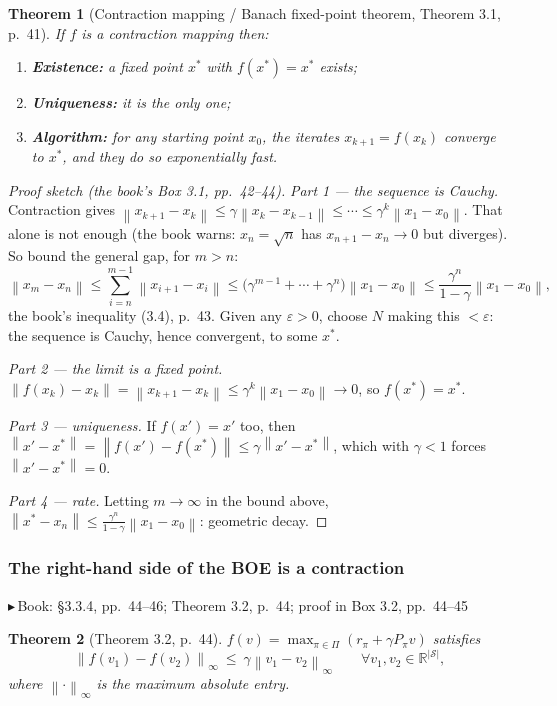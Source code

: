 \documentclass[11pt, letterpaper]{article}
\theoremstyle{runin}
\theoremstyle{runinplain}
\newtheorem{theorem}{Theorem}[section]
\theoremstyle{remark}
\newcommand{\R}{\mathbb{R}}
\newcommand{\norm}[1]{\left\lVert #1 \right\rVert}
\newcommand{\Sspace}{\mathcal{S}}
\newcommand{\bk}[1]{{\color{bookblue}\small$\blacktriangleright$\,\textsf{Book: #1}}}
\begin{document}
\begin{theorem}[Contraction mapping / Banach fixed-point theorem, Theorem 3.1, p.~41]
If $f$ is a contraction mapping then:
\begin{enumerate}
  \item \textbf{Existence:} a fixed point $x^*$ with $f(x^*)=x^*$ exists;
  \item \textbf{Uniqueness:} it is the only one;
  \item \textbf{Algorithm:} for any starting point $x_0$, the iterates
        $x_{k+1}=f(x_k)$ converge to $x^*$, and they do so exponentially fast.
\end{enumerate}
\end{theorem}

\begin{proof}[Proof sketch (the book's Box 3.1, pp.~42--44)]
\emph{Part 1 --- the sequence is Cauchy.} Contraction gives
$\norm{x_{k+1}-x_k}\le\gamma\norm{x_k-x_{k-1}}\le\cdots\le\gamma^k\norm{x_1-x_0}$.
That alone is not enough (the book warns: $x_n=\sqrt n$ has
$x_{n+1}-x_n\to0$ but diverges). So bound the general gap, for $m>n$:
\[
  \norm{x_m-x_n}\le\sum_{i=n}^{m-1}\norm{x_{i+1}-x_i}
  \le\bigl(\gamma^{m-1}+\cdots+\gamma^{n}\bigr)\norm{x_1-x_0}
  \le\frac{\gamma^n}{1-\gamma}\norm{x_1-x_0},
\]
the book's inequality (3.4), p.~43. Given any $\varepsilon>0$, choose $N$ making
this $<\varepsilon$: the sequence is Cauchy, hence convergent, to some $x^*$.

\emph{Part 2 --- the limit is a fixed point.}
$\norm{f(x_k)-x_k}=\norm{x_{k+1}-x_k}\le\gamma^k\norm{x_1-x_0}\to0$, so
$f(x^*)=x^*$.

\emph{Part 3 --- uniqueness.} If $f(x')=x'$ too, then
$\norm{x'-x^*}=\norm{f(x')-f(x^*)}\le\gamma\norm{x'-x^*}$, which with $\gamma<1$
forces $\norm{x'-x^*}=0$.

\emph{Part 4 --- rate.} Letting $m\to\infty$ in the bound above,
$\norm{x^*-x_n}\le\frac{\gamma^n}{1-\gamma}\norm{x_1-x_0}$: geometric decay.
\end{proof}

\subsubsection{The right-hand side of the BOE is a contraction}

\bk{\S3.3.4, pp.~44--46; Theorem 3.2, p.~44; proof in Box 3.2, pp.~44--45}

\begin{theorem}[Theorem 3.2, p.~44]
$f(v)=\max_{\pi\in\Pi}(r_\pi+\gamma P_\pi v)$ satisfies
\[
  \norm{f(v_1)-f(v_2)}_\infty\ \le\ \gamma\norm{v_1-v_2}_\infty
  \qquad\forall v_1,v_2\in\R^{|\Sspace|},
\]
where $\norm{\cdot}_\infty$ is the maximum absolute entry.
\end{theorem}
\end{document}
